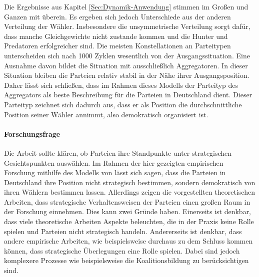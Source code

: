 Die Ergebnisse aus Kapitel \ref{Sec:Dynamik-Anwendung} stimmen im Großen und Ganzen mit \citet{laver2005policy} überein. Es ergeben sich jedoch Unterschiede aus der anderen Verteilung der Wähler. Insbesondere die unsymmetrische Verteilung sorgt dafür, dass manche Gleichgewichte nicht zustande kommen und die Hunter und Predatoren erfolgreicher sind.
Die meisten Konstellationen an Parteitypen unterscheiden sich nach 1000 Zyklen wesentlich von der Ausgangssituation. Eine Ausnahme davon bildet die Situation mit ausschließlich Aggregatoren. In dieser Situation bleiben die Parteien relativ stabil in der Nähe ihrer Ausgangsposition. Daher lässt sich schließen, dass im Rahmen dieses Modells der Parteityp des Aggregators als beste Beschreibung für die Parteien in Deutschland dient. Dieser Parteityp zeichnet sich dadurch aus, dass er als Position die durchschnittliche Position seiner Wähler annimmt, also demokratisch organisiert ist.

\paragraph{Forschungsfrage}
Die Arbeit sollte klären, ob Parteien ihre Standpunkte unter strategischen Gesichtspunkten auswählen. Im Rahmen der hier gezeigten empirischen Forschung mithilfe des Modells von \citet{laver2005policy} lässt sich sagen, dass die Parteien in Deutschland ihre Position nicht strategisch bestimmen, sondern demokratisch von ihren Wählern bestimmen lassen. Allerdings zeigen die vorgestellten theoretischen Arbeiten, dass strategische Verhaltensweisen der Parteien einen großen Raum in der Forschung einnehmen. Dies kann zwei Gründe haben.
Einerseits ist denkbar, dass viele theoretische Arbeiten Aspekte beleuchten, die in der Praxis keine Rolle spielen und Parteien nicht strategisch handeln.
Andererseits ist denkbar, dass andere empirische Arbeiten, wie beispielsweise \citet{schofield1998germany} durchaus zu dem Schluss kommen können, dass strategische Überlegungen eine Rolle spielen. Dabei sind jedoch komplexere Prozesse wie beispielsweise die Koalitionsbildung zu berücksichtigen sind.


